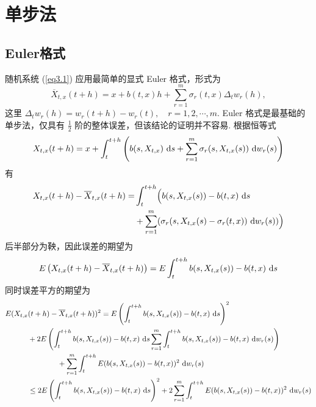 \section{单步法}
\subsection{Euler格式}
随机系统 (\ref{eq3.1}) 应用最简单的显式 Euler 格式，形式为
\begin{equation}\label{eq3.6}
	\overline{X}_{t,x}(t+h) = x + b(t,x)h+\sum_{r=1}^{m} \sigma_r(t,x) \Delta_t w_r(h),
\end{equation}
这里 $\Delta_t w_r(h) = w_r(t+h) - w_r(t),\quad r=1,2,\cdots,m$. 
Euler 格式是最基础的单步法，仅具有 $\frac12$ 阶的整体误差，但该结论的证明并不容易. 根据恒等式
\begin{equation}\label{eq3.7}
	X_{t,x}(t+h) = x+\int _t^{t+h} \left( b(s,X_{t,x}) \text{ d} s + \sum_{r=1}^m \sigma_r (s,X_{t,x}(s)) \text{ d} w_r(s) \right)
\end{equation}
有 
\begin{equation}\label{eq3.8}
	\begin{aligned} 
	X_{t,x}(t+h) - \overline{X}_{t,x}(t+h) =& \int_t^{t+h} \Bigl( b(s,X_{t,x}(s)) - b(t,x) \text{ d} s\\
	& + \sum_{r=1}^m  (\sigma_r(s,X_{t,x}(s) -\sigma_r(t,x)) \text{ d} w_r(s)) \Bigl)
	\end{aligned} 
\end{equation}
后半部分为鞅，因此误差的期望为
\begin{equation}\label{eq3.9}
	E\left(X_{t,x}(t+h) - \overline{X}_{t,x}(t+h) \right) = 
	E \int_t^{t+h}  b(s,X_{t,x}(s)) - b(t,x) \text{ d} s
\end{equation}
同时误差平方的期望为
\begin{equation}\label{eq3.10}
	\begin{aligned}
	E( X_{t,x}&(t+h) - \overline{X}_{t,x}(t+h) ) ^2 = 
		E\left(\int_t^{t+h}  b(s,X_{t,x}(s)) - b(t,x) \text{ d} s\right)^2 \\
		&+2E \left(  \int_t^{t+h}  b(s,X_{t,x}(s)) - b(t,x) \text{ d} s \sum_{r=1}^m
		 \int_t^{t+h}  b(s,X_{t,x}(s)) - b(t,x) \text{ d} w_r(s) \right)\\
		& \qquad\qquad + \sum_{r=1}^m \int_t^{t+h}  E(b(s,X_{t,x}(s)) - b(t,x))^2 \text{ d} w_r(s)\\
		& \le  2 E\left(\int_t^{t+h}  b(s,X_{t,x}(s)) - b(t,x) \text{ d} s\right)^2  
		 + 2 \sum_{r=1}^m \int_t^{t+h}  E(b(s,X_{t,x}(s)) - b(t,x))^2 \text{ d} w_r(s)
	\end{aligned}
\end{equation}
